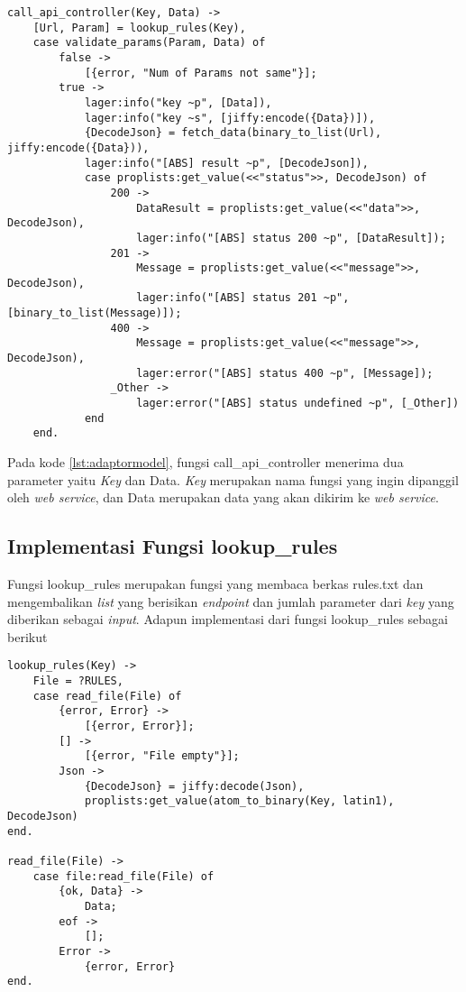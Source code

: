 \begin{minipage}{\linewidth}
\begin{lstlisting}[caption={Implementasi fungsi untuk pemanggilan \textit{adaptor} dari model},label={lst:adaptormodel}]
call_api_controller(Key, Data) ->
	[Url, Param] = lookup_rules(Key),
	case validate_params(Param, Data) of
		false ->
			[{error, "Num of Params not same"}];
		true ->
			lager:info("key ~p", [Data]),
			lager:info("key ~s", [jiffy:encode({Data})]),
			{DecodeJson} = fetch_data(binary_to_list(Url), jiffy:encode({Data})),
			lager:info("[ABS] result ~p", [DecodeJson]),
			case proplists:get_value(<<"status">>, DecodeJson) of
				200 ->
					DataResult = proplists:get_value(<<"data">>, DecodeJson),
					lager:info("[ABS] status 200 ~p", [DataResult]);
				201 ->
					Message = proplists:get_value(<<"message">>, DecodeJson),
					lager:info("[ABS] status 201 ~p", [binary_to_list(Message)]);
				400 ->
					Message = proplists:get_value(<<"message">>, DecodeJson),
					lager:error("[ABS] status 400 ~p", [Message]);
				_Other -> 
					lager:error("[ABS] status undefined ~p", [_Other])
			end  
	end.
\end{lstlisting}
\end{minipage}

Pada kode \ref{lst:adaptormodel}, fungsi call\_api\_controller menerima dua parameter yaitu \textit{Key} dan Data. \textit{Key} merupakan nama fungsi yang ingin dipanggil oleh \textit{web service}, dan Data merupakan data yang akan dikirim ke \textit{web service}.

\subsection{Implementasi Fungsi lookup\_rules}

Fungsi lookup\_rules merupakan fungsi yang membaca berkas rules.txt dan mengembalikan \textit{list} yang berisikan \textit{endpoint} dan jumlah parameter dari \textit{key} yang diberikan sebagai \textit{input}. Adapun implementasi dari fungsi lookup\_rules sebagai berikut

\begin{minipage}{\linewidth}
\begin{lstlisting}[caption={Implementasi fungsi lookup\_rules},label={lst:lookuprules}]
lookup_rules(Key) ->
	File = ?RULES,
	case read_file(File) of
		{error, Error} ->
			[{error, Error}];
		[] ->
			[{error, "File empty"}];
		Json ->
			{DecodeJson} = jiffy:decode(Json),
			proplists:get_value(atom_to_binary(Key, latin1), DecodeJson)
end.

read_file(File) ->
	case file:read_file(File) of
		{ok, Data} ->
			Data;
		eof ->
			[];
		Error ->
			{error, Error}
end.
\end{lstlisting}
\end{minipage}


